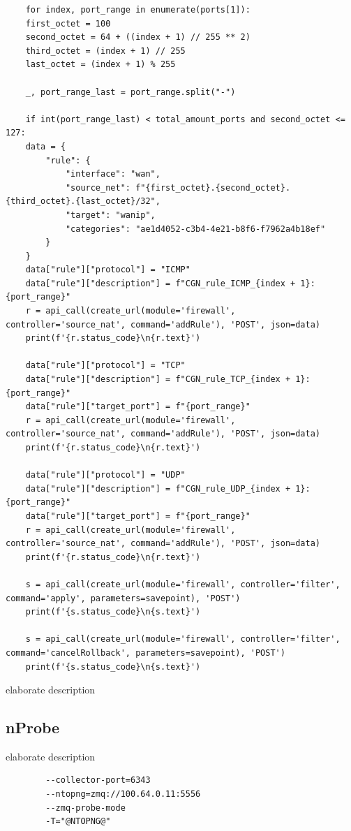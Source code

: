 \begin{verbatim}
    for index, port_range in enumerate(ports[1]):
    first_octet = 100
    second_octet = 64 + ((index + 1) // 255 ** 2)
    third_octet = (index + 1) // 255
    last_octet = (index + 1) % 255

    _, port_range_last = port_range.split("-")

    if int(port_range_last) < total_amount_ports and second_octet <= 127:
    data = {
        "rule": {
            "interface": "wan",
            "source_net": f"{first_octet}.{second_octet}.{third_octet}.{last_octet}/32",
            "target": "wanip",
            "categories": "ae1d4052-c3b4-4e21-b8f6-f7962a4b18ef"
        }
    }
    data["rule"]["protocol"] = "ICMP"
    data["rule"]["description"] = f"CGN_rule_ICMP_{index + 1}: {port_range}"
    r = api_call(create_url(module='firewall', controller='source_nat', command='addRule'), 'POST', json=data)
    print(f'{r.status_code}\n{r.text}')

    data["rule"]["protocol"] = "TCP"
    data["rule"]["description"] = f"CGN_rule_TCP_{index + 1}: {port_range}"
    data["rule"]["target_port"] = f"{port_range}"
    r = api_call(create_url(module='firewall', controller='source_nat', command='addRule'), 'POST', json=data)
    print(f'{r.status_code}\n{r.text}')

    data["rule"]["protocol"] = "UDP"
    data["rule"]["description"] = f"CGN_rule_UDP_{index + 1}: {port_range}"
    data["rule"]["target_port"] = f"{port_range}"
    r = api_call(create_url(module='firewall', controller='source_nat', command='addRule'), 'POST', json=data)
    print(f'{r.status_code}\n{r.text}')

    s = api_call(create_url(module='firewall', controller='filter', command='apply', parameters=savepoint), 'POST')
    print(f'{s.status_code}\n{s.text}')

    s = api_call(create_url(module='firewall', controller='filter', command='cancelRollback', parameters=savepoint), 'POST')
    print(f'{s.status_code}\n{s.text}')
\end{verbatim}
\begin{listing}[!htbp]
    \caption[Python CGN code]{elaborate description}
    \label{code:PythonCGN}
\end{listing}

\subsection{nProbe}
\begin{listing}[!htbp]
    \caption[nProbe configuration]{elaborate description}
    \label{code:nProbeConf}

    \begin{verbatim}
        --collector-port=6343
        --ntopng=zmq://100.64.0.11:5556
        --zmq-probe-mode
        -T="@NTOPNG@"
    \end{verbatim}
\end{listing}

